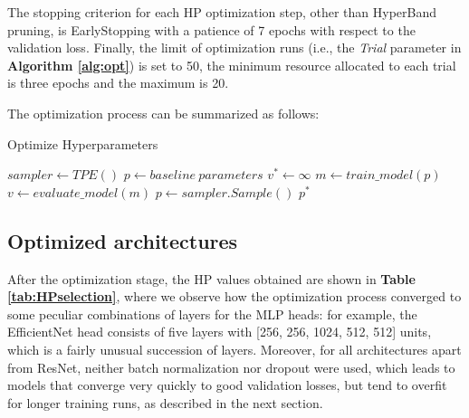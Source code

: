 \noindent
The stopping criterion for each HP optimization step, other than HyperBand pruning, is EarlyStopping with a patience of 7 epochs with respect to the validation loss. Finally, the limit of optimization runs (i.e., the \textit{Trial} parameter in \textbf{Algorithm \ref{alg:opt}}) is set to 50, the minimum resource allocated to each trial is three epochs and the maximum is 20. 

\noindent
The optimization process can be summarized as follows:
\begin{algorithm}[ht!]
\caption{Optimize Hyperparameters}\label{alg:opt}
    $sampler \leftarrow TPE()$\;
    $p \leftarrow baseline\ parameters$\;
    $v^* \leftarrow \infty$\;
    {
        $m \leftarrow train\_model(p)$ 
        $v \leftarrow evaluate\_model(m)$
        $p \leftarrow sampler.Sample()$\;
    }
    \Return $p^*$
\end{algorithm}


\subsection{Optimized architectures} %


\noindent
After the optimization stage, the HP values obtained are shown in \textbf{Table \ref{tab:HPselection}}, where we observe how the optimization process converged to some peculiar combinations of layers for the MLP heads: for example, the EfficientNet head consists of five layers with [256, 256, 1024, 512, 512] units, which is a fairly unusual succession of layers. Moreover, for all architectures apart from ResNet, neither batch normalization nor dropout were used, which leads to models that converge very quickly to good validation losses, but tend to overfit for longer training runs, as described in the next section.

